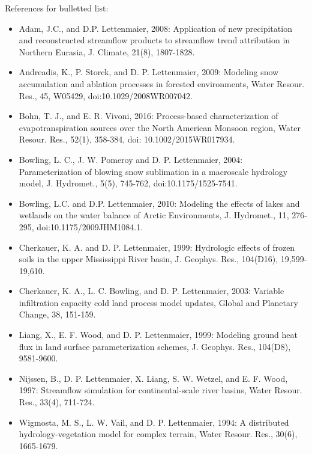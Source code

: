 \documentclass[gmd, manuscript]{copernicus}
\begin{document}
References for bulletted list:
\begin{itemize}
\item Adam, J.C., and D.P. Lettenmaier, 2008: Application of new precipitation and reconstructed streamflow products to streamflow trend attribution in Northern Eurasia, J. Climate, 21(8), 1807-1828.
\item Andreadis, K., P. Storck, and D. P. Lettenmaier, 2009: Modeling snow accumulation and ablation processes in forested environments, Water Resour. Res., 45, W05429, doi:10.1029/2008WR007042.
\item Bohn, T. J., and E. R. Vivoni, 2016: Process-based characterization of evapotranspiration sources over the North American Monsoon region, Water Resour. Res., 52(1), 358-384, doi: 10.1002/2015WR017934.
\item Bowling, L. C., J. W. Pomeroy and D. P. Lettenmaier, 2004: Parameterization of blowing snow sublimation in a macroscale hydrology model, J. Hydromet., 5(5), 745-762, doi:10.1175/1525-7541.
\item Bowling, L.C. and D.P. Lettenmaier, 2010: Modeling the effects of lakes and wetlands on the water balance of Arctic Environments, J. Hydromet., 11, 276-295, doi:10.1175/2009JHM1084.1.
\item Cherkauer, K. A. and D. P. Lettenmaier, 1999: Hydrologic effects of frozen soils in the upper Mississippi River basin, J. Geophys. Res., 104(D16), 19,599-19,610.
\item Cherkauer, K. A., L. C. Bowling, and D. P. Lettenmaier, 2003: Variable infiltration capacity cold land process model updates, Global and Planetary Change, 38, 151-159.
\item Liang, X., E. F. Wood, and D. P. Lettenmaier, 1999: Modeling ground heat flux in land surface parameterization schemes, J. Geophys. Res., 104(D8), 9581-9600.
\item Nijssen, B., D. P. Lettenmaier, X. Liang, S. W. Wetzel, and E. F. Wood, 1997: Streamflow simulation for continental-scale river basins, Water Resour. Res., 33(4), 711-724.
\item Wigmosta, M. S., L. W. Vail, and D. P. Lettenmaier, 1994: A distributed hydrology-vegetation model for complex terrain, Water Resour. Res., 30(6), 1665-1679.
\end{itemize}
\end{document}
